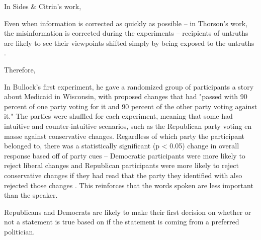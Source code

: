 In Sides & Citrin's work, 

Even when information is corrected as quickly as possible -- in Thorson's work, the misinformation is corrected during the experiments -- recipients of untruths are likely to see their viewpoints shifted simply by being exposed to the untruths \citep{thorson2016belief}.


Therefore, 




In Bullock's first experiment, he gave a randomized group of participants a story about Medicaid in Wisconsin, with proposed changes that had "passed with 90 percent of one party voting for it and 90 percent of the other party voting against it." The parties were shuffled for each experiment, meaning that some had intuitive and counter-intuitive scenarios, such as the Republican party voting en masse against conservative changes. Regardless of which party the participant belonged to, there was a statistically significant (p < 0.05) change in overall response based off of party cues -- Democratic participants were more likely to reject liberal changes and Republican participants were more likely to reject conservative changes if they had read that the party they identified with also rejected those changes \citep{bullock2007experiments}. This reinforces that the words spoken are less important than the speaker. 



 Republicans and Democrats are likely to make their first decision on whether or not a statement is true based on if the statement is coming from a preferred politician. 